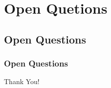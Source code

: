 \documentclass{beamer}
\begin{document}
\section{Open Quetions}
\subsection{Open Questions}
\begin{frame}
\frametitle{Open Questions}
\end{frame}

\appendix


\begin{frame}[plain]
 \vskip 1cm 
\begin{center}
Thank You!
\end{center}
\end{frame}


\begin{frame}[plain]
\end{frame}

\begin{frame}[plain]
\end{frame}

\begin{frame}[plain]
\end{frame}
\end{document}
